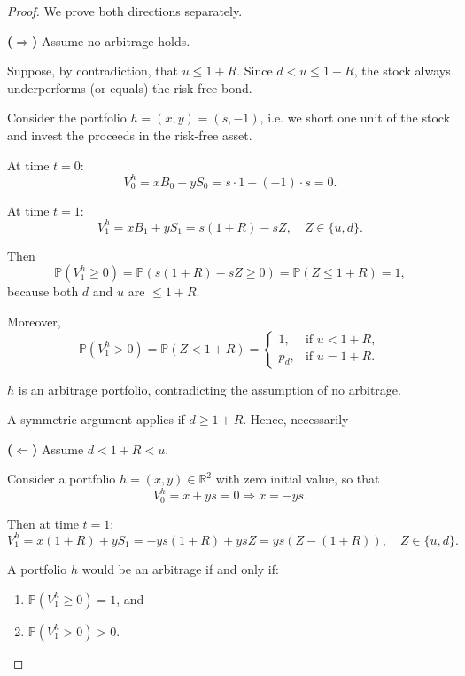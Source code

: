 \documentclass[12pt,a4paper]{article}
\theoremstyle{definition}
\newcommand{\R}{\mathbb{R}}
\newcommand{\Prob}{\mathbb{P}}
\begin{document}
\begin{proof}
We prove both directions separately.

\textbf{($\Rightarrow$)} Assume no arbitrage holds.

Suppose, by contradiction, that $u \leq 1 + R$. Since $d < u \leq 1 + R$, the stock always underperforms (or equals) the risk-free bond.

Consider the portfolio $h = (x,y) = (s, -1)$, i.e. we short one unit of the stock and invest the proceeds in the risk-free asset.

At time $t = 0$:
\[
V_0^h = xB_0 + yS_0 = s \cdot 1 + (-1) \cdot s = 0.
\]

At time $t = 1$:
\[
V_1^h = xB_1 + yS_1 = s(1 + R) - sZ, \quad Z \in \{u, d\}.
\]

Then
\[
\Prob(V_1^h \geq 0) = \Prob(s(1 + R) - sZ \geq 0) = \Prob(Z \leq 1 + R) = 1,
\]
because both $d$ and $u$ are $\leq 1 + R$.

Moreover,
\[
\Prob(V_1^h > 0) = \Prob(Z < 1 + R) = \begin{cases}
1, & \text{if } u < 1 + R, \\
p_d, & \text{if } u = 1 + R.
\end{cases}
\]

$h$ is an arbitrage portfolio, contradicting the assumption of no arbitrage.

A symmetric argument applies if $d \geq 1 + R$. Hence, necessarily

\begin{center}
\end{center}

\textbf{($\Leftarrow$)} Assume $d < 1 + R < u$.

Consider a portfolio $h = (x,y) \in \R^2$ with zero initial value, so that
\[
V_0^h = x + ys = 0 \Rightarrow x = -ys.
\]

Then at time $t = 1$:
\[
V_1^h = x(1 + R) + yS_1 = -ys(1 + R) + ysZ = ys(Z - (1 + R)), \quad Z \in \{u, d\}.
\]

A portfolio $h$ would be an arbitrage if and only if:
\begin{enumerate}[label=(\alph*)]
\item $\Prob(V_1^h \geq 0) = 1$, and
\item $\Prob(V_1^h > 0) > 0$.
\end{enumerate}


\end{proof}
\end{document}
